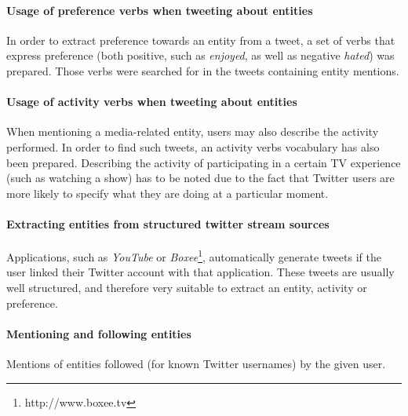 \paragraph{Usage of preference verbs when tweeting about entities}
In order to extract preference towards an entity from a tweet, a set of verbs
that express preference (both positive, such as \textit{enjoyed}, as well as negative \textit{hated})
was prepared. Those verbs were searched for in the tweets containing entity mentions.
\paragraph{Usage of activity verbs when tweeting about entities}
When mentioning a media-related entity, users may also describe the activity performed.
In order to find such tweets, an activity verbs vocabulary has also been prepared.
Describing the activity of participating in a certain TV experience (such
as watching a show) has to be noted due to the fact that Twitter users are more
likely to specify what they are doing at a particular moment.

\paragraph{Extracting entities from structured twitter stream sources}
Applications, such as \textit{YouTube} or \textit{Boxee}\footnote{http://www.boxee.tv}, automatically generate tweets
if the user linked their Twitter account with that application. These tweets are
usually well structured, and therefore very suitable to extract an entity, activity or preference.
\paragraph{Mentioning and following entities}
Mentions of entities followed (for known Twitter usernames) by the given user.

